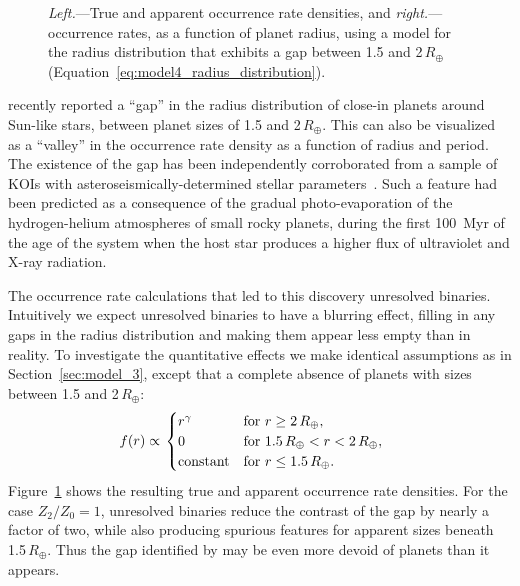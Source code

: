 \documentclass[12pt,modern,trackchanges]{aastex61}
\begin{document}
\begin{figure}[!t]
    \centering
    \caption{ {\it Left.}---True and apparent occurrence rate densities,
      and {\it right.}---occurrence rates, as a function of planet
      radius, using a model for the radius distribution that exhibits
      a gap between 1.5 and 2\,$R_\oplus$
      (Equation~\ref{eq:model4_radius_distribution}). 
    }
    \label{fig:model_4}
\end{figure}

\citet{fulton_california-_2017} recently reported a ``gap'' in the
radius distribution of close-in planets around Sun-like stars, between
planet sizes of 1.5 and 2\,$R_\oplus$.  This can also be visualized as
a ``valley'' in the occurrence rate density as a function of radius
and period.  The existence of the gap has been independently
corroborated from a sample of KOIs with asteroseismically-determined
stellar parameters~\citep{van_eylen_asteroseismic_2017}.  Such a
feature had been predicted as a consequence of the gradual
photo-evaporation of the hydrogen-helium atmospheres of small rocky
planets, during the first 100~Myr of the age of the system when the
host star produces a higher flux of ultraviolet and X-ray
radiation.

The occurrence rate calculations that led to this discovery  
unresolved binaries.
Intuitively we expect
unresolved binaries to have a blurring effect, filling in any gaps in
the  radius distribution and making them appear less empty than in
reality.  To investigate the quantitative effects we make identical
assumptions as in Section~\ref{sec:model_3}, except that  a complete absence of planets with
sizes between 1.5 and 2\,$R_\oplus$:
\begin{align}
    f(r)
    &\propto
    \left.
    \begin{cases}
        r^\gamma & \text{for } r\geq 2\,R_\oplus, \\
        0 & \text{for } 1.5\,R_\oplus < r < 2\,R_\oplus, \\
        {\rm constant} & \text{for } r\leq 1.5\,R_\oplus.
    \end{cases}
    \right.
    \label{eq:model4_radius_distribution}
\end{align}
Figure~\ref{fig:model_4} shows the resulting true and apparent
occurrence rate densities.  For the case $Z_2/Z_0=1$, unresolved
binaries reduce the contrast of the gap by nearly a factor of two,
while also producing spurious features for apparent sizes beneath
1.5\,$R_\oplus$.  Thus the gap identified by
\citet{fulton_california-_2017} may be even more devoid of planets
than it appears.
\end{document}
